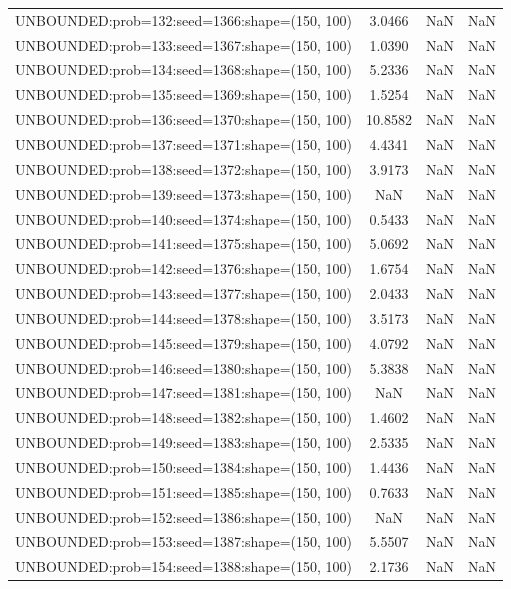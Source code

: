 \begin{longtable}{lccc}
UNBOUNDED:prob=132:seed=1366:shape=(150, 100) &  3.0466 &   NaN &    NaN \\
UNBOUNDED:prob=133:seed=1367:shape=(150, 100) &  1.0390 &   NaN &    NaN \\
UNBOUNDED:prob=134:seed=1368:shape=(150, 100) &  5.2336 &   NaN &    NaN \\
UNBOUNDED:prob=135:seed=1369:shape=(150, 100) &  1.5254 &   NaN &    NaN \\
UNBOUNDED:prob=136:seed=1370:shape=(150, 100) & 10.8582 &   NaN &    NaN \\
UNBOUNDED:prob=137:seed=1371:shape=(150, 100) &  4.4341 &   NaN &    NaN \\
UNBOUNDED:prob=138:seed=1372:shape=(150, 100) &  3.9173 &   NaN &    NaN \\
UNBOUNDED:prob=139:seed=1373:shape=(150, 100) &     NaN &   NaN &    NaN \\
UNBOUNDED:prob=140:seed=1374:shape=(150, 100) &  0.5433 &   NaN &    NaN \\
UNBOUNDED:prob=141:seed=1375:shape=(150, 100) &  5.0692 &   NaN &    NaN \\
UNBOUNDED:prob=142:seed=1376:shape=(150, 100) &  1.6754 &   NaN &    NaN \\
UNBOUNDED:prob=143:seed=1377:shape=(150, 100) &  2.0433 &   NaN &    NaN \\
UNBOUNDED:prob=144:seed=1378:shape=(150, 100) &  3.5173 &   NaN &    NaN \\
UNBOUNDED:prob=145:seed=1379:shape=(150, 100) &  4.0792 &   NaN &    NaN \\
UNBOUNDED:prob=146:seed=1380:shape=(150, 100) &  5.3838 &   NaN &    NaN \\
UNBOUNDED:prob=147:seed=1381:shape=(150, 100) &     NaN &   NaN &    NaN \\
UNBOUNDED:prob=148:seed=1382:shape=(150, 100) &  1.4602 &   NaN &    NaN \\
UNBOUNDED:prob=149:seed=1383:shape=(150, 100) &  2.5335 &   NaN &    NaN \\
UNBOUNDED:prob=150:seed=1384:shape=(150, 100) &  1.4436 &   NaN &    NaN \\
UNBOUNDED:prob=151:seed=1385:shape=(150, 100) &  0.7633 &   NaN &    NaN \\
UNBOUNDED:prob=152:seed=1386:shape=(150, 100) &     NaN &   NaN &    NaN \\
UNBOUNDED:prob=153:seed=1387:shape=(150, 100) &  5.5507 &   NaN &    NaN \\
UNBOUNDED:prob=154:seed=1388:shape=(150, 100) &  2.1736 &   NaN &    NaN \\

\end{longtable}
